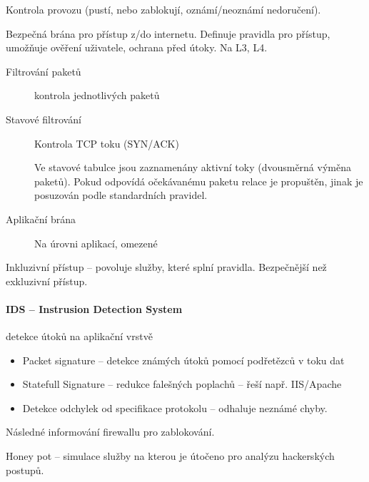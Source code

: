\documentclass[a4paper, 11pt]{report}
\begin{document}
Kontrola provozu (pustí, nebo zablokují, oznámí/neoznámí nedoručení).

Bezpečná brána pro přístup z/do internetu. Definuje pravidla pro přístup, umožňuje ověření uživatele, ochrana před útoky. Na L3, L4.

\begin{description}
	\item[Filtrování paketů] kontrola jednotlivých paketů
	\item[Stavové filtrování] Kontrola TCP toku (SYN/ACK)
	
	Ve stavové tabulce jsou zaznamenány aktivní toky (dvousměrná výměna paketů). Pokud odpovídá očekávanému paketu relace je propuštěn, jinak je posuzován podle standardních pravidel.
	\item[Aplikační brána] Na úrovni aplikací, omezené
\end{description}

Inkluzivní přístup -- povoluje služby, které splní pravidla. Bezpečnější než exkluzivní přístup.

\paragraph{IDS -- Instrusion Detection System} detekce útoků na aplikační vrstvě
\begin{itemize}
	\item Packet signature -- detekce známých útoků pomocí podřetězců v toku dat
	\item Statefull Signature -- redukce falešných poplachů -- řeší např. IIS/Apache
	\item Detekce odchylek od specifikace protokolu -- odhaluje neznámé chyby.
\end{itemize}

Následné informování firewallu pro zablokování.

Honey pot -- simulace služby na kterou je útočeno pro analýzu hackerských postupů.
\end{document}
